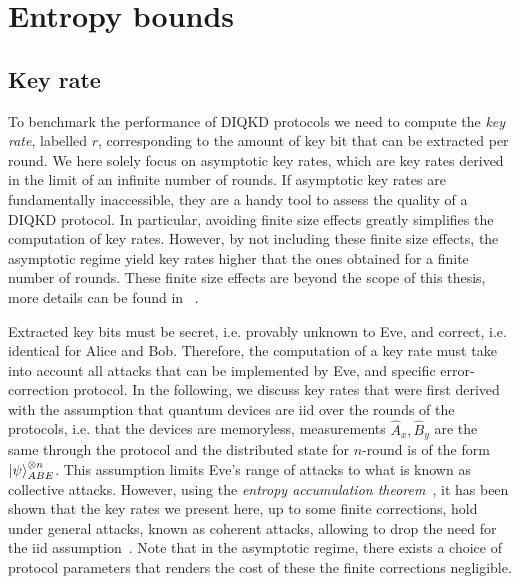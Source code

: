 \chapter{Entropy bounds}
\label{chap:entropybound}

\section{Key rate}

To benchmark the performance of DIQKD protocols we need to compute the \textit{key rate}, labelled $r$, corresponding to the amount of key bit that can be extracted per round.
We here solely focus on asymptotic key rates, which are key rates derived in the limit of an infinite number of rounds.
If asymptotic key rates are fundamentally inaccessible, they are a handy tool to assess the quality of a DIQKD protocol.
In particular, avoiding finite size effects greatly simplifies the computation of key rates.
However, by not including these finite size effects, the asymptotic regime yield key rates higher that the ones obtained for a finite number of rounds.
These finite size effects are beyond the scope of this thesis, more details can be found in ~\cite{Tan2021,Tan2022,Primaatmaja2023}.

Extracted key bits must be secret, i.e. provably unknown to Eve, and correct, i.e. identical for Alice and Bob.
Therefore, the computation of a key rate must take into account all attacks that can be implemented by Eve, and specific error-correction protocol.
In the following, we discuss key rates that were first derived with the assumption that quantum devices are \acrfull{iid} over the rounds of the protocols, i.e. that the devices are memoryless, measurements $\hat{A}_x,\hat{B}_y$ are the same through the protocol and the distributed state for $n$-round is of the form $\ket{\psi}_{ABE}^{\otimes n}$.
This assumption limits Eve's range of attacks to what is known as collective attacks.
However, using the \textit{entropy accumulation theorem}~\cite{Dupuis2019,Dupuis2020}, it has been shown that the key rates we present here, up to some finite corrections, hold under general attacks, known as coherent attacks, allowing to drop the need for the \acrshort{iid} assumption~\cite{ArnonFriedman2019}.
Note that in the asymptotic regime, there exists a choice of protocol parameters that renders the cost of these the finite corrections negligible.


\medbreak

